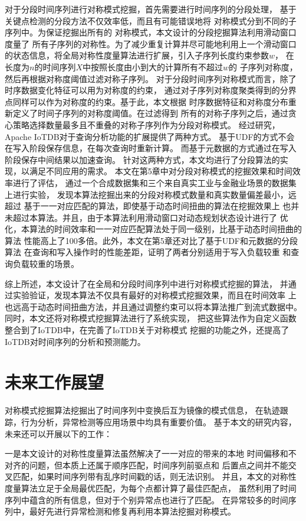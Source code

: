 对于分段时间序列进行对称模式挖掘，首先需要进行时间序列的分段处理，
基于关键点检测的分段方法不仅效率低，而且有可能错误地将
对称模式分到不同的子序列中。为保证挖掘出所有的
对称模式，本文设计的分段挖掘算法利用滑动窗口度量了
所有子序列的对称性。为了减少重复计算并尽可能地利用上一个滑动窗口
的状态信息，将全局对称性度量算法进行扩展，引入子序列长度约束参数$w$，
在长度为$n$的时间序列$X$中按照长度由小到大的计算所有不超过$w$的
子序列对称度，然后再根据对称度阈值过滤对称子序列。
对于分段时间序列对称模式而言，除了时序数据变化特征可以用为对称度的约束，
通过对子序列对称度聚类得到的分界点同样可以作为对称度的约束。基于此，本文根据
时序数据特征和对称度分布重新定义了时间子序列的对称度阈值。在过滤得到
所有的对称子序列之后，通过贪心策略选择数量最多且不重叠的对称子序列作为分段对称模式。
经过研究，Apache IoTDB对于查询分析功能的扩展提供了两种方式。
基于UDF的方式不会在写入阶段保存信息，在每次查询时重新计算。
而基于元数据的方式通过在写入阶段保存中间结果以加速查询。
针对这两种方式，本文均进行了分段算法的实现，以满足不同应用的需求。
本文在第5章中对分段对称模式的挖掘效果和时间效率进行了评估，
通过一个合成数据集和三个来自真实工业与金融业场景的数据集上进行实验，
发现本算法挖掘出来的分段对称模式数量和真实数量偏差最小，远超过
基于一一对应匹配的算法，即使基于动态时间扭曲的算法在挖掘效果上
也并未超过本算法。并且，由于本算法利用滑动窗口对动态规划状态设计进行了
优化，本算法的时间效率和一一对应匹配算法处于同一级别，比基于动态时间扭曲的算法
性能高上了100多倍。此外，本文在第5章还对比了基于UDF和元数据的分段算法
在查询和写入操作时的性能差距，证明了两者分别适用于写入负载较重
和查询负载较重的场景。


综上所述，本文设计了在全局和分段时间序列中进行对称模式挖掘的算法，
并通过实验验证，发现本算法不仅具有最好的对称模式挖掘效果，而且在时间效率
上也远高于动态时间扭曲方法，并且通过调整约束可以将本算法推广到流式数据中。
同时，本文还将对称模式挖掘算法进行了系统实现，
把这些算法作为自定义函数整合到了IoTDB中，在完善了IoTDB关于对称模式
挖掘的功能之外，还提高了IoTDB对时间序列的分析和预测能力。

\section{未来工作展望}
对称模式挖掘算法挖掘出了时间序列中变换后互为镜像的模式信息，
在轨迹跟踪，行为分析，异常检测等应用场景中均具有重要价值。
基于本文的研究内容，未来还可以开展以下的工作：

一是本文设计的对称性度量算法虽然解决了一一对应的带来的本地
时间偏移和不对齐的问题，但本质上还属于顺序匹配，时间序列前驱点和
后置点之间并不能交叉匹配，如果时间序列带有乱序时间戳的话，则无法识别。
并且，本文的对称性度量算法立足于全局最优匹配，为每个点都计算了最佳匹配点，
虽然利用了时间序列中蕴含的所有信息，但对于个别异常点也进行了匹配。
在异常较多的时间序列中，最好先进行异常检测和修复再利用本算法挖掘对称模式。

